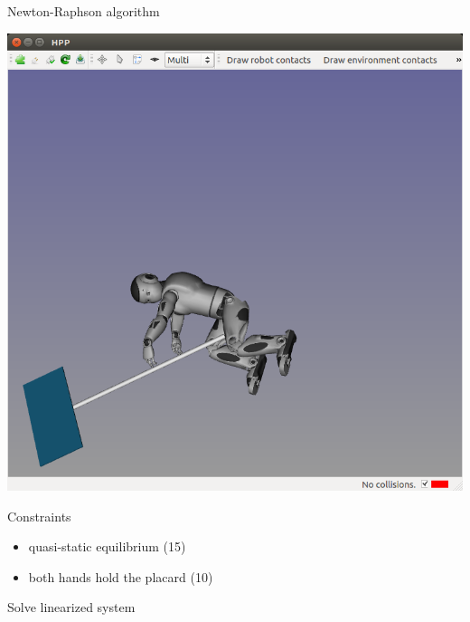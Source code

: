 \begin {frame} {Newton-Raphson algorithm}
  \parbox {.5\linewidth} {
    \centerline {
      \includegraphics [width=\linewidth] {figures/seq/romeo-1.png}
    }
  }
  \hspace*{.05\linewidth}
  \parbox {.39\linewidth} {
    Constraints
    \begin {itemize}
    \item quasi-static equilibrium (15)
    \item both hands hold the placard (10)
    \end{itemize}
  }
  \centerline {
    Solve linearized system
  }
\end {frame}

